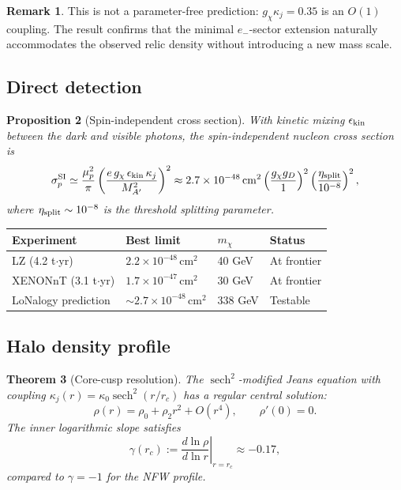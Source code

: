 \documentclass[12pt]{article}
\theoremstyle{plain}
\newtheorem{theorem}{Theorem}[section]
\newtheorem{proposition}[theorem]{Proposition}
\theoremstyle{definition}
\newtheorem{remark}[theorem]{Remark}
\numberwithin{equation}{section}
\DeclareMathOperator{\sech}{sech}
\begin{document}
\begin{remark}
This is not a parameter-free prediction: $g_\chi\kappa_j=0.35$ is an
$O(1)$ coupling.  The result confirms that the minimal $e_-$-sector
extension naturally accommodates the observed relic density without
introducing a new mass scale.
\end{remark}

\subsection{Direct detection}

\begin{proposition}[Spin-independent cross section]\label{prop:directdetect}
With kinetic mixing $\epsilon_{\rm kin}$ between the dark and visible
photons, the spin-independent nucleon cross section is
\[
\sigma_p^{\rm SI} \simeq
\frac{\mu_p^2}{\pi}
\left(\frac{e\,g_\chi\,\epsilon_{\rm kin}\,\kappa_j}{M_{A'}^2}\right)^2
\approx 2.7\times10^{-48}\,\mathrm{cm}^2
\left(\frac{g_\chi g_D}{1}\right)^2
\left(\frac{\eta_{\rm split}}{10^{-8}}\right)^2,
\]
where $\eta_{\rm split}\sim10^{-8}$ is the threshold splitting parameter.
\end{proposition}

\begin{center}
\begin{tabular}{llll}
\toprule
Experiment & Best limit & $m_\chi$ & Status\\
\midrule
LZ (4.2 t$\cdot$yr) & $2.2\times10^{-48}\,\mathrm{cm}^2$ & 40 GeV & At frontier\\
XENONnT (3.1 t$\cdot$yr) & $1.7\times10^{-47}\,\mathrm{cm}^2$ & 30 GeV & At frontier\\
\midrule
LoNalogy prediction & $\sim2.7\times10^{-48}\,\mathrm{cm}^2$ & 338 GeV & Testable\\
\bottomrule
\end{tabular}
\end{center}

\subsection{Halo density profile}

\begin{theorem}[Core-cusp resolution]\label{thm:halo}
The $\sech^2$-modified Jeans equation with coupling $\kappa_j(r)=\kappa_0\sech^2(r/r_c)$
has a regular central solution:
\[
\rho(r) = \rho_0 + \rho_2 r^2 + O(r^4),\qquad \rho'(0)=0.
\]
The inner logarithmic slope satisfies
\[
\gamma(r_c) := \left.\frac{d\ln\rho}{d\ln r}\right|_{r=r_c} \approx -0.17,
\]
compared to $\gamma=-1$ for the NFW profile.
\end{theorem}
\end{document}
